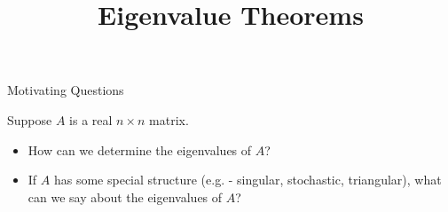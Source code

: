 \title{Eigenvalue Theorems}
\subtitle{\SubTitleName}
\institute[]{\Course}
\author{\Instructor}
\maketitle   




\begin{frame}{Motivating Questions}

    Suppose $A$ is a real $n\times n$ matrix. 
    
    \begin{itemize}
        \item<2-> How can we determine the eigenvalues of $A$? 
        \item<3-> If $A$ has some special structure (e.g. - singular, stochastic, triangular), what can we say about the eigenvalues of $A$? 
    \end{itemize}
    
    
\end{frame}





